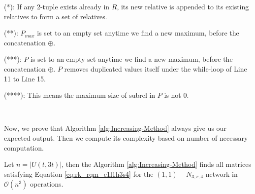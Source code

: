 ({*}): If any 2-tuple exists already in $R$, its new relative is
appended to its existing relatives to form a set of relatives.

({*}{*}): $P_{max}$ is set to an empty set anytime we find a new
maximum, before the concatenation $\oplus$.

({*}{*}{*}): $P$ is set to an empty set anytime we find a new maximum,
before the concatenation $\oplus$. $P$ removes duplicated values
itself under the while-loop of Line 11 to Line 15.

({*}{*}{*}{*}): This means the maximum size of subrel in $P$ is not
0.

~

Now, we prove that Algorithm \ref{alg:Increasing-Method} always give
us our expected output. Then we compute its complexity based on number
of necessary computation.
\begin{thm}
Let $n=\left|U(t,3t)\right|$, then the Algorithm \ref{alg:Increasing-Method}
finds all matrices satisfying Equation \ref{eq:rk_rqm_e1l1h3s4} for
the $\left(1,1\right)-\ensuremath{N}_{3,r,4}$ network in $\mathcal{O}\left(n^{3}\right)$
operations.
\end{thm}
